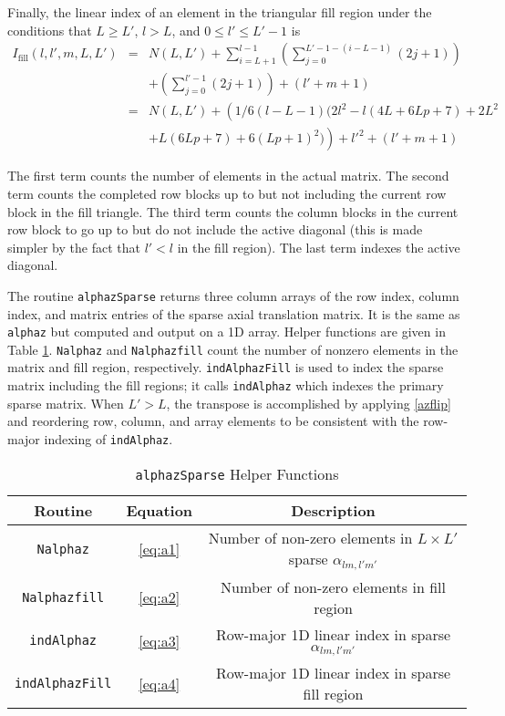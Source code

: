 Finally, the linear index of an element in the triangular fill region under the conditions that $L \ge L'$, $l > L$, and $0 \le l' \le L'-1$ is
\begin{eqnarray}
I_{\textrm{fill}}(l,l',m,L,L') &=& N(L,L') + \sum_{i= L+1}^{l-1} \left(\sum_{j=0}^{L'-1-(i-L-1)}(2j+1)\right) \nonumber \\
\ & \ & + \left(\sum_{j=0}^{l'-1} (2j + 1)\right) + (l' + m + 1)  \label{eq:a4} \\
\ & =& N(L,L') + \left( 1/6(l-L-1)(2l^2-l(4L+6Lp+7)+2L^2\right. \nonumber \\
\ & \ & \left. +L(6Lp+7)+6(Lp+1)^2)\right) + l'^2 + (l' + m + 1) 
\end{eqnarray}

The first term counts the number of elements in the actual matrix.  The second term counts the completed row blocks up to but not including the current row block in the fill triangle.  The third term counts the column blocks in the current row block to go up to but do not include the active diagonal (this is made simpler by the fact that $l' < l$ in the fill region).  The last term indexes the active diagonal.  



The routine \texttt{alphazSparse} returns three column arrays of the row index, column index, and matrix entries of the sparse axial translation matrix.  It is the same as \texttt{alphaz} but computed and output on a 1D array. Helper functions are given in Table \ref{sparsetranshelp}. \texttt{Nalphaz} and \texttt{Nalphazfill} count the number of nonzero elements in the matrix and fill region, respectively. \texttt{indAlphazFill} is used to index the sparse matrix including the fill regions; it calls \texttt{indAlphaz} which indexes the primary sparse matrix.  When $L' > L$, the transpose is accomplished by applying \eqref{azflip} and reordering row, column, and array elements to be consistent with the row-major indexing of \texttt{indAlphaz}.  


\begin{table}[htbp]
\caption{\texttt{alphazSparse} Helper Functions}
\begin{center}
\begin{tabular}{|c|c|c|}
\hline
Routine & Equation & Description \\
\hline
\texttt{Nalphaz} &   \eqref{eq:a1} & Number of non-zero elements in $L \times L'$ sparse $\alpha_{lm,l'm'}$ \\
\hline
\texttt{Nalphazfill} &  \eqref{eq:a2} & Number of non-zero elements in fill region \\
\hline
\texttt{indAlphaz} &   \eqref{eq:a3} & Row-major 1D linear index in sparse $\alpha_{lm,l'm'}$ \\
\hline
\texttt{indAlphazFill} &  \eqref{eq:a4} & Row-major 1D linear index in sparse fill region \\ 
\hline
\end{tabular}
\end{center}
\label{sparsetranshelp}
\end{table}%


